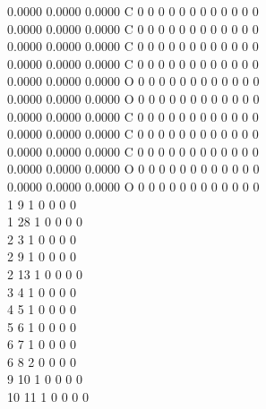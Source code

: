 \documentclass[11pt,titlepage,dvipdfmx,twoside]{jarticle}
\begin{document}
\begin{oframed}
{    0.0000    0.0000    0.0000  C  0  0  0  0  0  0  0  0  0  0  0  0      \\
    0.0000    0.0000    0.0000  C  0  0  0  0  0  0  0  0  0  0  0  0      \\
    0.0000    0.0000    0.0000  C  0  0  0  0  0  0  0  0  0  0  0  0      \\
    0.0000    0.0000    0.0000  C  0  0  0  0  0  0  0  0  0  0  0  0      \\
    0.0000    0.0000    0.0000  O  0  0  0  0  0  0  0  0  0  0  0  0      \\
    0.0000    0.0000    0.0000  O  0  0  0  0  0  0  0  0  0  0  0  0      \\
    0.0000    0.0000    0.0000  C  0  0  0  0  0  0  0  0  0  0  0  0      \\
    0.0000    0.0000    0.0000  C  0  0  0  0  0  0  0  0  0  0  0  0      \\
    0.0000    0.0000    0.0000  C  0  0  0  0  0  0  0  0  0  0  0  0      \\
    0.0000    0.0000    0.0000  O  0  0  0  0  0  0  0  0  0  0  0  0      \\
    0.0000    0.0000    0.0000  O  0  0  0  0  0  0  0  0  0  0  0  0      \\
  1  9  1  0  0  0  0                                                      \\
  1 28  1  0  0  0  0                                                      \\
  2  3  1  0  0  0  0                                                      \\
  2  9  1  0  0  0  0                                                      \\
  2 13  1  0  0  0  0                                                      \\
  3  4  1  0  0  0  0                                                      \\
  4  5  1  0  0  0  0                                                      \\
  5  6  1  0  0  0  0                                                      \\
  6  7  1  0  0  0  0                                                      \\
  6  8  2  0  0  0  0                                                      \\
  9 10  1  0  0  0  0                                                      \\
 10 11  1  0  0  0  0                                                      \\
}
\end{oframed}
\end{document}
